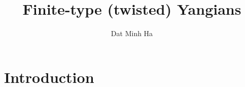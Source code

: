 

\setcounter{section}{-1}


\newcommand{\simpleroots}{\mathbb{I}}



    \title{Finite-type (twisted) Yangians}
    
    \author{Dat Minh Ha}
    \maketitle
    
    \begin{abstract}
    
    \end{abstract}
    
    {
    \hypersetup{} 
    \tableofcontents %
    }

    \section{Introduction}

    

    

    

    

    \begin{appendices}
        
    \end{appendices}
    
    \printbibliography

